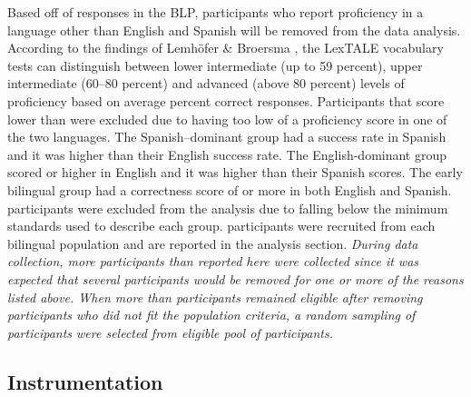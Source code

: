 Based off of responses in the BLP, participants who report proficiency in a language other than English and Spanish will be removed from the data analysis. According to the findings of Lemhöfer \& Broersma \parencite*{Lemhofer2012-hz}, the LexTALE vocabulary tests can distinguish between lower intermediate (up to 59 percent), upper intermediate (60–80 percent) and advanced (above 80 percent) levels of proficiency based on average percent correct responses. Participants that score lower than %
were excluded due to having too low of a proficiency score in one of the two languages. The Spanish–dominant group had a %
success rate in Spanish and it was higher than their English success rate. The English-dominant group scored %
or higher in English and it was higher than their Spanish scores. The early bilingual group had a correctness score of %
or more in both English and Spanish. %
participants were excluded from the analysis due to falling below the minimum standards used to describe each group.%
participants were recruited from each bilingual population and are reported in the analysis section. \emph{During data collection, more participants than reported here were collected since it was expected that several participants would be removed for one or more of the reasons listed above. When more than %
participants remained eligible after removing participants who did not fit the population criteria, a random sampling of%
participants were selected from eligible pool of participants.}



\subsection{Instrumentation}

